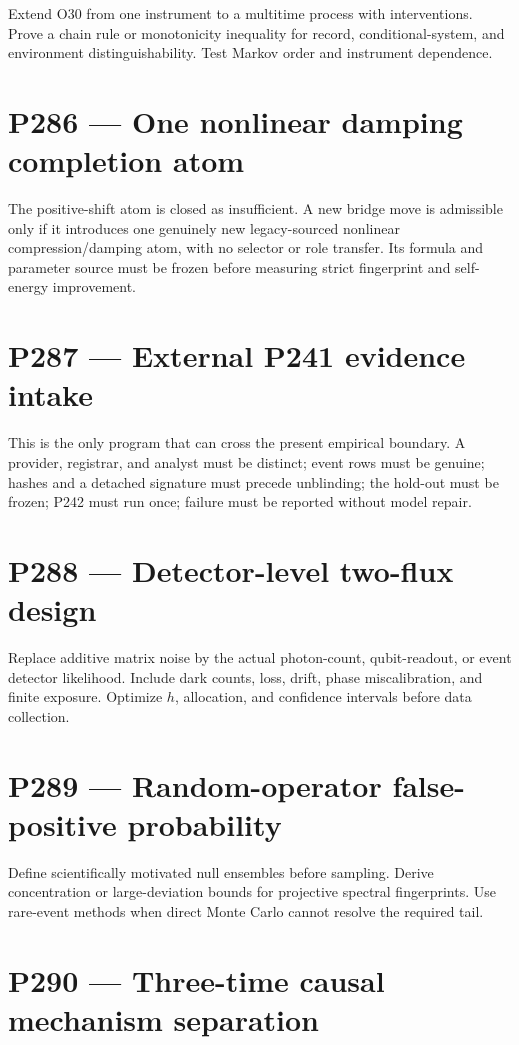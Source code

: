 \documentclass[11pt,a4paper,openany]{report}
\begin{document}
Extend O30 from one instrument to a multitime process with interventions. Prove a chain rule or monotonicity inequality for record, conditional-system, and environment distinguishability. Test Markov order and instrument dependence.

\section{P286 --- One nonlinear damping completion atom}

The positive-shift atom is closed as insufficient. A new bridge move is admissible only if it introduces one genuinely new legacy-sourced nonlinear compression/\allowbreak{}damping atom, with no selector or role transfer. Its formula and parameter source must be frozen before measuring strict fingerprint and self-energy improvement.

\section{P287 --- External P241 evidence intake}

This is the only program that can cross the present empirical boundary. A provider, registrar, and analyst must be distinct; event rows must be genuine; hashes and a detached signature must precede unblinding; the hold-out must be frozen; P242 must run once; failure must be reported without model repair.

\section{P288 --- Detector-level two-flux design}

Replace additive matrix noise by the actual photon-count, qubit-readout, or event detector likelihood. Include dark counts, loss, drift, phase miscalibration, and finite exposure. Optimize \(h\), allocation, and confidence intervals before data collection.

\section{P289 --- Random-operator false-positive probability}

Define scientifically motivated null ensembles before sampling. Derive concentration or large-deviation bounds for projective spectral fingerprints. Use rare-event methods when direct Monte Carlo cannot resolve the required tail.

\section{P290 --- Three-time causal mechanism separation}
\end{document}
